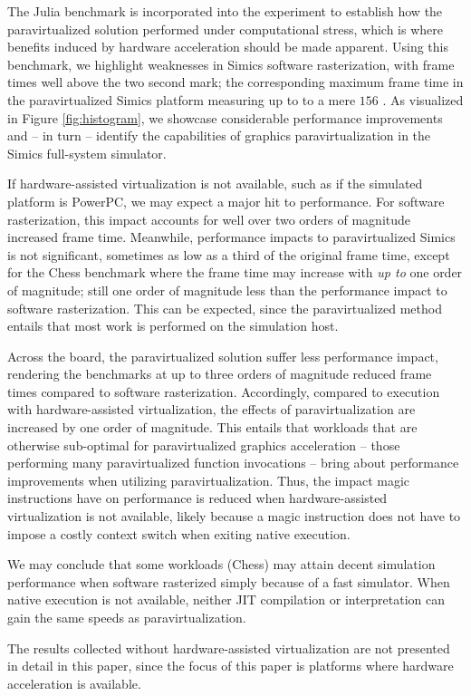 The Julia benchmark is incorporated into the experiment to establish how the paravirtualized solution performed under computational stress, which is where benefits induced by hardware acceleration should be made apparent.
Using this benchmark, we highlight weaknesses in Simics software rasterization, with frame times well above the two second mark; the corresponding maximum frame time in the paravirtualized Simics platform measuring up to to a mere $156$ \milli\second .
As visualized in Figure \ref{fig:histogram}, we showcase considerable performance improvements and -- in turn -- identify the capabilities of graphics paravirtualization in the Simics full-system simulator.

If hardware-assisted virtualization is not available, such as if the simulated platform is PowerPC, we may expect a major hit to performance.
For software rasterization, this impact accounts for well over two orders of magnitude increased frame time.
Meanwhile, performance impacts to paravirtualized Simics is not significant, sometimes as low as a third of the original frame time, except for the Chess benchmark where the frame time may increase with \textit{up to} one order of magnitude; still one order of magnitude less than the performance impact to software rasterization.
This can be expected, since the paravirtualized method entails that most work is performed on the simulation host.

Across the board, the paravirtualized solution suffer less performance impact, rendering the benchmarks at up to three orders of magnitude reduced frame times compared to software rasterization.
Accordingly, compared to execution with hardware-assisted virtualization, the effects of paravirtualization are increased by one order of magnitude.
This entails that workloads that are otherwise sub-optimal for paravirtualized graphics acceleration -- those performing many paravirtualized function invocations -- bring about performance improvements when utilizing paravirtualization.
Thus, the impact magic instructions have on performance is reduced when hardware-assisted virtualization is not available, likely because a magic instruction does not have to impose a costly context switch when exiting native execution.

We may conclude that some workloads (Chess) may attain decent simulation performance when software rasterized simply because of a fast simulator.
When native execution is not available, neither JIT compilation or interpretation can gain the same speeds as paravirtualization.

The results collected without hardware-assisted virtualization are not presented in detail in this paper, since the focus of this paper is platforms where hardware acceleration is available.
